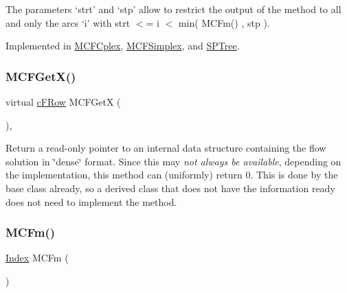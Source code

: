 The parameters `strt' and `stp' allow to restrict the output of the method to all and only the arcs `i' with strt $<$= i $<$ min( M\+C\+Fm() , stp ). 

Implemented in \mbox{\hyperlink{class_m_c_f_cplex_adfe83485d41648441446726b336069d1}{M\+C\+F\+Cplex}}, \mbox{\hyperlink{class_m_c_f_simplex_adfe83485d41648441446726b336069d1}{M\+C\+F\+Simplex}}, and \mbox{\hyperlink{class_s_p_tree_add59deabe73d1060973c9fd366d8fde8}{S\+P\+Tree}}.

\mbox{\label{class_m_c_f_class_a4eb307e0707adaef99bb0e08c9e10eb8}} 
\subsubsection{\texorpdfstring{M\+C\+F\+Get\+X()}{MCFGetX()}\hspace{0.1cm}{\footnotesize\ttfamily [2/2]}}
{\footnotesize\ttfamily virtual \mbox{\hyperlink{class_m_c_f_class_ad325f3193dbba0ddef1da4e72d29eda6}{c\+F\+Row}} M\+C\+F\+GetX (\begin{DoxyParamCaption}\item[{void}]{ }\end{DoxyParamCaption})\hspace{0.3cm}{\ttfamily [inline]}, {\ttfamily [virtual]}}

Return a read-\/only pointer to an internal data structure containing the flow solution in \char`\"{}dense\char`\"{} format. Since this may {\itshape not always be available}, depending on the implementation, this method can (uniformly) return 0. This is done by the base class already, so a derived class that does not have the information ready does not need to implement the method. \mbox{\label{class_m_c_f_class_ab4d5a0d0fc49882de0b4eb3146f1b7a6}} 
\subsubsection{\texorpdfstring{M\+C\+Fm()}{MCFm()}}
{\footnotesize\ttfamily \mbox{\hyperlink{class_m_c_f_class_ad53d6229d7ec28555a9c9c2fd9abf773}{Index}} M\+C\+Fm (\begin{DoxyParamCaption}\item[{void}]{ }\end{DoxyParamCaption})\hspace{0.3cm}{\ttfamily [inline]}}


